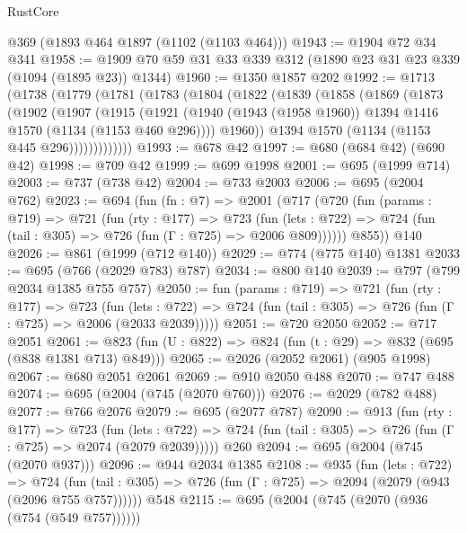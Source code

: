 \begin{lexlean}{RustCore}
\begin{coremodule}
    @369
    (@1893 @464 @1897 (@1102 (@1103 @464)))
@1943 := @1904 @72 @34 @341
@1958 := @1909 @70 @59 @31 @33 @339 @312 (@1890 @23 @31 @23 @339 (@1094 (@1895 @23)) @1344)
@1960 := @1350 @1857 @202
@1992 := @1713
    (@1738
      (@1779
        (@1781
          (@1783
            (@1804
              (@1822
                (@1839
                  (@1858
                    (@1869
                      (@1873
                        (@1902
                          (@1907
                            (@1915
                              (@1921
                                (@1940
                                  (@1943 (@1958 @1960))
                                  @1394
                                  @1416
                                  @1570
                                  (@1134 (@1153 @460 @296))))
                              @1960))
                          @1394
                          @1570
                          (@1134 (@1153 @445 @296)))))))))))))
@1993 := @678 @42
@1997 := @680 (@684 @42) (@690 @42)
@1998 := @709 @42
@1999 := @699 @1998
@2001 := @695 (@1999 @714)
@2003 := @737 (@738 @42)
@2004 := @733 @2003
@2006 := @695 (@2004 @762)
@2023 := @694
    (fun (fn : @7) =>
    @2001
      (@717
        (@720
          (fun (params : @719) =>
          @721
            (fun (rty : @177) =>
            @723
              (fun (lets : @722) =>
              @724 (fun (tail : @305) => @726 (fun (Γ : @725) => @2006 @809))))))
        @855))
    @140
@2026 := @861 (@1999 (@712 @140))
@2029 := @774 (@775 @140) @1381
@2033 := @695 (@766 (@2029 @783) @787)
@2034 := @800 @140
@2039 := @797 (@799 @2034 @1385 @755 @757)
@2050 := fun (params : @719) =>
  @721
    (fun (rty : @177) =>
    @723
      (fun (lets : @722) =>
      @724 (fun (tail : @305) => @726 (fun (Γ : @725) => @2006 (@2033 @2039)))))
@2051 := @720 @2050
@2052 := @717 @2051
@2061 := @823 (fun (U : @822) => @824 (fun (t : @29) => @832 (@695 (@838 @1381 @713) @849)))
@2065 := @2026 (@2052 @2061) (@905 @1998)
@2067 := @680 @2051 @2061
@2069 := @910 @2050 @488
@2070 := @747 @488
@2074 := @695 (@2004 (@745 (@2070 @760)))
@2076 := @2029 (@782 @488)
@2077 := @766 @2076
@2079 := @695 (@2077 @787)
@2090 := @913
    (fun (rty : @177) =>
    @723
      (fun (lets : @722) =>
      @724 (fun (tail : @305) => @726 (fun (Γ : @725) => @2074 (@2079 @2039)))))
    @260
@2094 := @695 (@2004 (@745 (@2070 @937)))
@2096 := @944 @2034 @1385
@2108 := @935
    (fun (lets : @722) =>
    @724 (fun (tail : @305) => @726 (fun (Γ : @725) => @2094 (@2079 (@943 (@2096 @755 @757))))))
    @548
@2115 := @695 (@2004 (@745 (@2070 (@936 (@754 (@549 @757))))))

\end{coremodule}
\end{lexlean}
